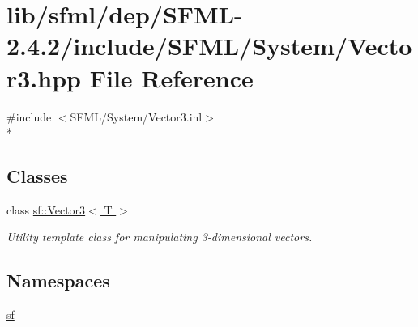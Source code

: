 \hypertarget{sfml_2dep_2_s_f_m_l-2_84_82_2include_2_s_f_m_l_2_system_2_vector3_8hpp}{\section{lib/sfml/dep/\-S\-F\-M\-L-\/2.4.2/include/\-S\-F\-M\-L/\-System/\-Vector3.hpp File Reference}
\label{sfml_2dep_2_s_f_m_l-2_84_82_2include_2_s_f_m_l_2_system_2_vector3_8hpp}
}
{\ttfamily \#include $<$S\-F\-M\-L/\-System/\-Vector3.\-inl$>$}\\*
\subsection*{Classes}
\begin{DoxyCompactItemize}
\item 
class \hyperlink{classsf_1_1_vector3}{sf\-::\-Vector3$<$ T $>$}
\begin{DoxyCompactList}\small\item\em Utility template class for manipulating 3-\/dimensional vectors. \end{DoxyCompactList}\end{DoxyCompactItemize}
\subsection*{Namespaces}
\begin{DoxyCompactItemize}
\item 
\hyperlink{namespacesf}{sf}
\end{DoxyCompactItemize}
